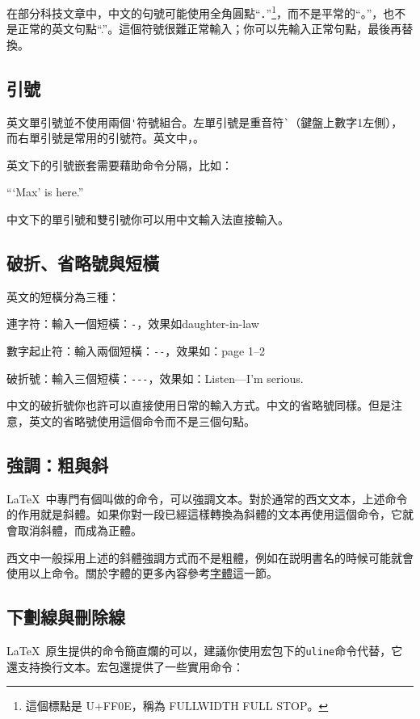 在部分科技文章中，中文的句號可能使用全角圓點“．”\footnote{這個標點是 U+FF0E，稱為 FULLWIDTH FULL STOP。}，而不是平常的“。”，也不是正常的英文句點“.”。這個符號很難正常輸入；你可以先輸入正常句點，最後再替換。

\subsection{引號}
英文單引號並不使用兩個\verb|'|符號組合。左單引號是重音符\verb|`|（鍵盤上數字1左側），而右單引號是常用的引號符。英文中，。

英文下的引號嵌套需要藉助命令分隔，比如：
\begin{codeshow}[listing side text, listing options={escapeinside=++}]
``\thinspace`Max' is here.''
\end{codeshow}
中文下的單引號和雙引號你可以用中文輸入法直接輸入。

\subsection{破折、省略號與短橫}
英文的短橫分為三種：
\begin{feai}
\item 連字符：輸入一個短橫：\verb|-|，效果如daughter-in-law
\item 數字起止符：輸入兩個短橫：\verb|--|，效果如：page 1--2
\item 破折號：輸入三個短橫：\verb|---|，效果如：Listen---I'm serious.
\end{feai}

中文的破折號你也許可以直接使用日常的輸入方式。中文的省略號同樣。但是注意，英文的省略號使用這個命令而不是三個句點。

\subsection{強調：粗與斜}
\LaTeX\ 中專門有個叫做的命令，可以強調文本。對於通常的西文文本，上述命令的作用就是斜體。如果你對一段已經這樣轉換為斜體的文本再使用這個命令，它就會取消斜體，而成為正體。

西文中一般採用上述的斜體強調方式而不是粗體，例如在説明書名的時候可能就會使用以上命令。關於字體的更多內容參考\hyperref[sec:font]{字體}這一節。

\subsection{下劃線與刪除線}
\LaTeX\ 原生提供的命令簡直爛的可以，建議你使用宏包下的\texttt{uline}命令代替，它還支持換行文本。宏包還提供了一些實用命令：

